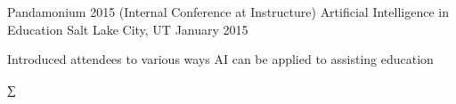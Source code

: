 \begin{cventries}
  \cventry
    {Pandamonium 2015 (Internal Conference at Instructure)}
    {Artificial Intelligence in Education}
    {Salt Lake City, UT}
    {January 2015}
    {
      \begin{cvitems}
        \item {Introduced attendees to various ways AI can be applied to assisting education}
      \end{cvitems}
    }
\end{cventries}
∑
